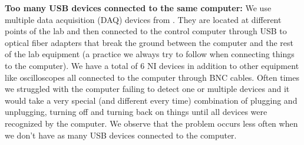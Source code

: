 {\bf Too many USB devices connected to the same computer:} We use multiple  data acquisition (DAQ) devices from . They are located at different points of the lab and then connected to the control computer through USB to optical fiber adapters that break the ground between the computer and the rest of the lab equipment (a practice we always try to follow when connecting things to the computer). We have a total of 6 NI devices in addition to other equipment like oscilloscopes all connected to the computer through BNC cables. Often times we struggled with the computer failing to detect one or multiple devices and it would take a very special (and different every time) combination of plugging and unplugging, turning off and turning back on things until all devices were recognized by the computer. We observe that the problem occurs less often when we don't have as many USB devices connected to the computer. 



 